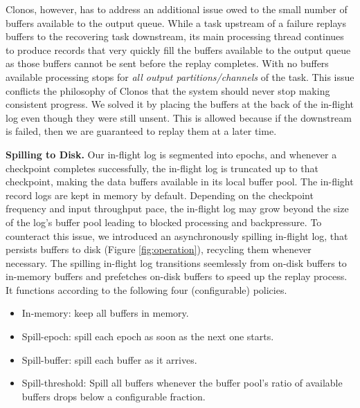 \documentclass[sigconf]{acmart}
\newcommand{\para}[1]{\vspace{1mm}\noindent\textbf{#1.}}
\begin{document}
Clonos, however, has to address an additional issue owed to the small number of buffers available to the output queue.
While a task upstream of a failure replays buffers to the recovering task downstream, its main processing thread continues to produce records that very quickly fill the buffers available to the output queue as those buffers cannot be sent before the replay completes.
With no buffers available processing stops for \textit{all output partitions/channels} of the task. This issue conflicts the philosophy of Clonos that the system should never stop making consistent progress.
We solved it by placing the buffers at the back of the in-flight log even though they were still unsent. This is allowed because if the downstream is failed, then we are guaranteed to replay them at a later time.

\para{Spilling to Disk} Our in-flight log is segmented into epochs, and whenever a checkpoint completes successfully, the in-flight log is truncated up to that checkpoint, making the data buffers available in its local buffer pool. 
The in-flight record logs are kept in memory by default. 
Depending on the checkpoint frequency  and input throughput pace, the in-flight log may grow beyond the size of the log's buffer pool leading to blocked processing and backpressure.
To counteract this issue, we introduced an asynchronously spilling in-flight log, that persists buffers to disk (Figure \ref{fig:operation}), recycling them whenever necessary.
The spilling in-flight log transitions seemlessly from on-disk buffers to in-memory buffers and prefetches on-disk buffers to speed up the replay process. It functions according to the following four (configurable) policies.

\begin{itemize}
    \item In-memory: keep all buffers in memory.
    \item Spill-epoch: spill each epoch as soon as the next one starts.
    \item Spill-buffer: spill each buffer as it arrives.
    \item Spill-threshold: Spill all buffers whenever the buffer pool's ratio of available buffers drops below a configurable fraction.
\end{itemize}
\end{document}
